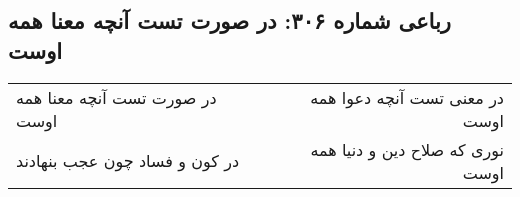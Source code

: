 \begin{center}
\section*{رباعی شماره ۳۰۶: در صورت تست آنچه معنا همه اوست}
\label{sec:0306}
\begin{longtable}{l p{0.5cm} r}
در صورت تست آنچه معنا همه اوست
&&
در معنی تست آنچه دعوا همه اوست
\\
در کون و فساد چون عجب بنهادند
&&
نوری که صلاح دین و دنیا همه اوست
\\
\end{longtable}
\end{center}
